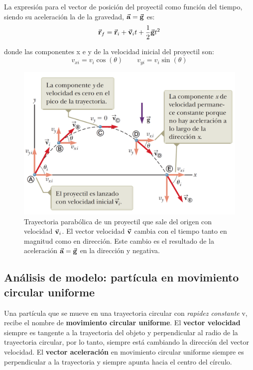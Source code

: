     \PN La expresión para el vector de posición del proyectil como función del tiempo, siendo su aceleración la de la
    gravedad, $\vec{\mathbf{a}} = \vec{\mathbf{g}}$ es:
    \begin{equation*}
      \vec{\mathbf{r}}_{f} = \vec{\mathbf{r}}_{i} + \vec{\mathbf{v}}_{i} t + \frac{1}{2} \vec{\mathbf{g}} t^{2}
    \end{equation*}

    \PN donde las componentes x e y de la velocidad inicial del proyectil son:
    \begin{equation*}
      v_{xi} = v_{i} \cos(\theta) \qquad v_{yi} = v_{i} \sin(\theta)
    \end{equation*}

    \begin{figure}[H]
      \centering
      \includegraphics[scale=0.35]{1/graphics_4/figure_2}
      \caption{Trayectoria parabólica de un proyectil que sale del origen con velocidad $\vec{\mathbf{v}}_{i}$. El vector
      velocidad $\vec{\mathbf{v}}$ cambia con el tiempo tanto en magnitud como en dirección. Este cambio es el resultado de la
      aceleración $\vec{\mathbf{a}} = \vec{\mathbf{g}}$ en la dirección y negativa.}
    \end{figure}

  \subsection{Análisis de modelo: partícula en movimiento circular uniforme}
    \PN Una partícula que se mueve en una trayectoria circular con \textit{rapidez constante} v, recibe el nombre de
    \textbf{movimiento circular uniforme}. El \textbf{vector velocidad} siempre es tangente a la trayectoria del objeto
    y perpendicular al radio de la trayectoria circular, por lo tanto, siempre está cambiando la dirección del vector
    velocidad. El \textbf{vector aceleración} en movimiento circular uniforme siempre es perpendicular a la trayectoria
    y siempre apunta hacia el centro del círculo.

